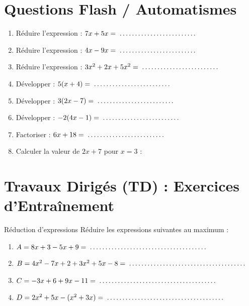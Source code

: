 \section{Questions Flash / Automatismes}

\begin{automatisme}
\begin{enumerate}[label=\textbf{Q\arabic*.}]
    \item Réduire l'expression : $7x + 5x = \pointille[4cm]$
    \item Réduire l'expression : $4x - 9x = \pointille[4cm]$
    \item Réduire l'expression : $3x^2 + 2x + 5x^2 = \pointille[4cm]$
    \item Développer : $5(x + 4) = \pointille[4cm]$
    \item Développer : $3(2x - 7) = \pointille[4cm]$
    \item Développer : $-2(4x - 1) = \pointille[4cm]$
    \item Factoriser : $6x + 18 = \pointille[4cm]$
    \item Calculer la valeur de $2x + 7$ pour $x = 3$ : \pointille[4cm]
\end{enumerate}
\end{automatisme}

\section{Travaux Dirigés (TD) : Exercices d'Entraînement}

\begin{exercice}[2 pts]{\capRealiser}{Réduction d'expressions}
Réduire les expressions suivantes au maximum :
\begin{enumerate}
    \item $A = 8x + 3 - 5x + 9 = \pointille[6cm]$
    \item $B = 4x^2 - 7x + 2 + 3x^2 + 5x - 8 = \pointille[6cm]$
    \item $C = -3x + 6 + 9x - 11 = \pointille[6cm]$
    \item $D = 2x^2 + 5x - (x^2 + 3x) = \pointille[6cm]$
\end{enumerate}
\end{exercice}

